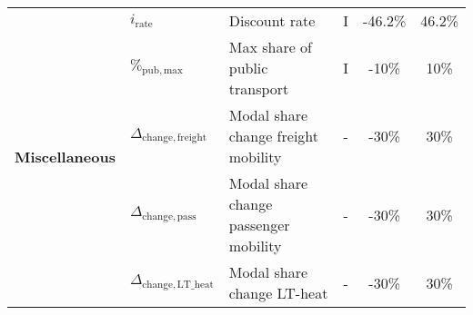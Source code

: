 \begin{table}[htbp!]
\begin{minipage}{\linewidth}
{\begin{tabular}{l l l c c c}
\multirow{6}{*}{\textbf{Miscellaneous}} &$i_{\mathrm{rate}}$  & Discount rate & I & -46.2\% & 46.2\% \\
& $\%_{\mathrm{pub,max}}$ & Max share of public transport & I & -10\% & 10\% \\
& $\Delta_{\mathrm{change,freight}}$ & Modal share change freight mobility & - & -30\% & 30\% \\
& $\Delta_{\mathrm{change,pass}}$ & Modal share change passenger mobility & - & -30\% & 30\% \\
& $\Delta_{\mathrm{change,LT\_heat}}$ & Modal share change LT-heat & - & -30\% & 30\% \\

\bottomrule							

\end{tabular}}
\end{minipage}
\end{table}


